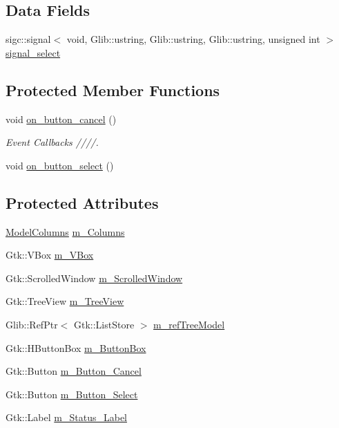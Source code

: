 \subsection*{\-Data \-Fields}
\begin{DoxyCompactItemize}
\item 
sigc\-::signal$<$ void, \*
\-Glib\-::ustring, \-Glib\-::ustring, \*
\-Glib\-::ustring, unsigned int $>$ \hyperlink{classFreyaAvahiView_a5b23deb59958d5e0d0776ea794255036}{signal\-\_\-select}
\end{DoxyCompactItemize}
\subsection*{\-Protected \-Member \-Functions}
\begin{DoxyCompactItemize}
\item 
void \hyperlink{classFreyaAvahiView_a238089db0631391462cc2cd37ab8d4f3}{on\-\_\-button\-\_\-cancel} ()
\begin{DoxyCompactList}\small\item\em \-Event \-Callbacks ////. \end{DoxyCompactList}\item 
void \hyperlink{classFreyaAvahiView_a29376be4aefd6d88dfac2fb4c5a5efa9}{on\-\_\-button\-\_\-select} ()
\end{DoxyCompactItemize}
\subsection*{\-Protected \-Attributes}
\begin{DoxyCompactItemize}
\item 
\hyperlink{classFreyaAvahiView_1_1ModelColumns}{\-Model\-Columns} \hyperlink{classFreyaAvahiView_a9c24ec63950f241dcfdc2625502dc5cc}{m\-\_\-\-Columns}
\item 
\-Gtk\-::\-V\-Box \hyperlink{classFreyaAvahiView_a2795d496bd3c74fc895e86ed8eedaa95}{m\-\_\-\-V\-Box}
\item 
\-Gtk\-::\-Scrolled\-Window \hyperlink{classFreyaAvahiView_a6e41d967e114d4df82378b8e4b34046f}{m\-\_\-\-Scrolled\-Window}
\item 
\-Gtk\-::\-Tree\-View \hyperlink{classFreyaAvahiView_ac65ebb1ece218ba64db9e8dd2a48ef87}{m\-\_\-\-Tree\-View}
\item 
\-Glib\-::\-Ref\-Ptr$<$ \-Gtk\-::\-List\-Store $>$ \hyperlink{classFreyaAvahiView_ad0265da7aa184158e137539bfa32c861}{m\-\_\-ref\-Tree\-Model}
\item 
\-Gtk\-::\-H\-Button\-Box \hyperlink{classFreyaAvahiView_a4f564cb1916b44f76df7bbe45e7d8f5d}{m\-\_\-\-Button\-Box}
\item 
\-Gtk\-::\-Button \hyperlink{classFreyaAvahiView_ae027532f98721bfc72a7995900661157}{m\-\_\-\-Button\-\_\-\-Cancel}
\item 
\-Gtk\-::\-Button \hyperlink{classFreyaAvahiView_a1a889ec913f877d2f0060cc75a8c04f5}{m\-\_\-\-Button\-\_\-\-Select}
\item 
\-Gtk\-::\-Label \hyperlink{classFreyaAvahiView_a4acd1137b7a41375d37a88d8576297bc}{m\-\_\-\-Status\-\_\-\-Label}
\end{DoxyCompactItemize}


